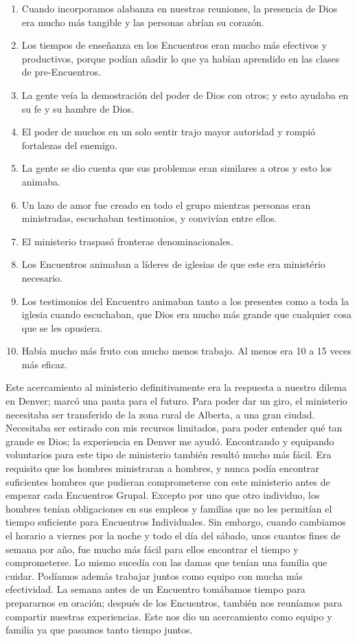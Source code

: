 \documentclass[twoside, 12pt]{book}
\begin{document}
\begin{enumerate}
	\item Cuando incorporamos alabanza en nuestras reuniones, la presencia de Dios era mucho más tangible y las personas abrían su corazón.
	\item Los tiempos de enseñanza en los Encuentros eran mucho más efectivos y productivos, porque podían añadir lo que ya habían aprendido en las clases de pre-Encuentros.
	\item La gente veía la demostración del poder de Dios con otros; y esto ayudaba en su fe y su hambre de Dios.
	\item El poder de muchos en un solo sentir trajo mayor autoridad y rompió fortalezas del enemigo.
	\item La gente se dio cuenta que sus problemas eran similares a otros y esto los animaba.
	\item Un lazo de amor fue creado en todo el grupo mientras personas eran ministradas, escuchaban testimonios, y convivían entre ellos.
	\item El ministerio traspasó fronteras denominacionales.
	\item Los Encuentros animaban a líderes de iglesias de que este era ministério necesario.
	\item Los testimonios del Encuentro animaban tanto a los presentes como a toda la iglesia cuando escuchaban, que Dios era mucho más grande que cualquier cosa que se les opusiera.
	\item Había mucho más fruto con mucho menos trabajo. Al menos era 10 a 15 veces más eficaz.
\end{enumerate} 

Este acercamiento al ministerio definitivamente era la respuesta a nuestro dilema en Denver; marcó una pauta para el futuro. Para poder dar un giro, el ministerio necesitaba ser transferido de la zona rural de Alberta, a una gran ciudad. Necesitaba ser estirado con mis recursos limitados, para poder entender qué tan grande es Dios; la experiencia en Denver me ayudó. Encontrando y equipando voluntarios para este tipo de ministerio también resultó mucho más fácil. Era requisito que los hombres ministraran a hombres, y nunca podía encontrar suficientes hombres que pudieran comprometerse con este ministerio antes de empezar cada Encuentros Grupal. Excepto por uno que otro individuo, los hombres tenían obligaciones en sus empleos y familias que no les permitían el tiempo suficiente para Encuentros Individuales. Sin embargo, cuando cambiamos el horario a viernes por la noche y todo el día del sábado, unos cuantos fines de semana por año, fue mucho más fácil para ellos encontrar el tiempo y comprometerse. Lo mismo sucedía con las damas que tenían una familia que cuidar. Podíamos además trabajar juntos como equipo con mucha más efectividad. La semana antes de un Encuentro tomábamos tiempo para prepararnos en oración; después de los Encuentros, también nos reuníamos para compartir nuestras experiencias. Este nos dio un acercamiento como equipo y familia ya que pasamos tanto tiempo juntos.\\
\end{document}
